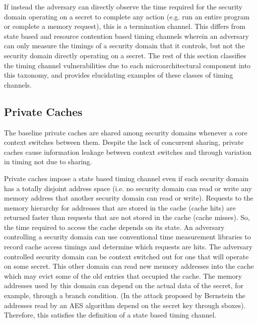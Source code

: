 If instead the adversary can directly observe the time required for the 
security domain operating on a secret to complete any action (e.g. run an 
entire program or complete a memory request), this is a termination channel.  
This differs from state based and resource contention based timing channels 
wherein an adversary can only measure the timings of a security domain that it 
controls, but not the security domain directly operating on a secret. The rest 
of this section classifies the timing channel vulnerabilities due to each 
microarchitectural component into this taxonomy, and provides elucidating 
examples of these classes of timing channels.

\subsection{Private Caches}
\label{sec:priv_cache}
The baseline private caches are shared among security domains whenever a core 
context switches between them. Despite the lack of concurrent sharing, private 
caches cause information leakage between context switches and through variation 
in timing not due to sharing.

Private caches impose a state based timing channel even if each security domain 
has a totally disjoint address space (i.e. no security domain can read or write 
any memory address that another security domain can read or write). Requests to 
the memory hierarchy for addresses that are stored in the cache (cache hits) 
are returned faster than requests that are not stored in the cache (cache 
misses). So, the time required to access the cache depends on its state. An 
adversary controlling a security domain can use conventional time measurement 
libraries to record cache access timings and determine which requests are hits.
The adversary controlled security domain can be context switched out for one 
that will operate on some secret. This other domain can read new memory 
addresses into the cache which may evict some of the old entries that occupied 
the cache. The memory addresses used by this domain can depend on the actual 
data of the secret, for example, through a branch condition. (In the attack 
proposed by Bernstein \cite{bernstein} the addresses read by an AES algorithm 
depend on the secret key through sboxes). Therefore, this satisfies the 
definition of a state based timing channel.

